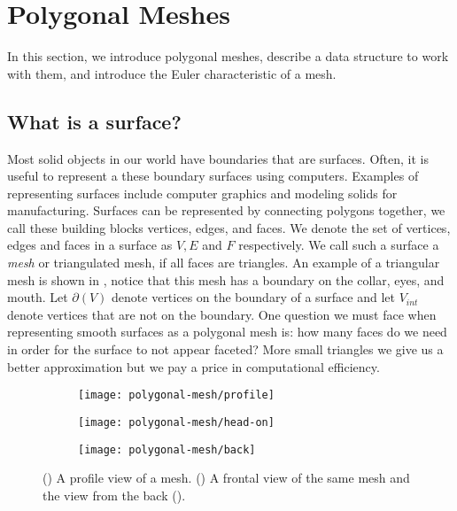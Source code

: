\section{Polygonal Meshes}
\label{sec:polygonal}

In this section, we introduce polygonal meshes, describe a data structure to 
work with them, and introduce the Euler characteristic of a mesh.

\subsection{What is a surface?}

Most solid objects in our world have boundaries that are surfaces.
Often, it is useful to represent a these boundary surfaces using computers.
Examples of representing surfaces include computer graphics and modeling solids for manufacturing.
Surfaces can be represented by connecting polygons together, we call these building blocks
vertices, edges, and faces. We denote the set of vertices, edges and faces in a surface as 
$V, E$ and $F$ respectively. We call such a surface a \emph{mesh}
or triangulated mesh, if all faces are triangles.
An example of a triangular mesh is shown in ,
notice that this mesh has a boundary on the collar, eyes, and mouth.
Let $\partial(V)$ denote vertices on the boundary of a surface and let $V_{int}$ 
denote vertices that are not on the boundary.
One question we must face when representing smooth surfaces as a polygonal mesh is:
how many faces do we need in order for the surface to not appear faceted?
More small triangles we give us a better approximation but we pay a price in computational
efficiency. 



 \begin{figure}[htb]
         \centering
        \begin{subfigure}[b]{0.3\textwidth}
         \texttt{[image: polygonal-mesh/profile]}
         \caption{}
 	 \label{fig:profile}
       \end{subfigure}
         \hspace{.6cm}
         \begin{subfigure}[b]{0.19\textwidth}
         \texttt{[image: polygonal-mesh/head-on]}
         \caption{}
          \label{fig:head-on}
         \end{subfigure}
             \hspace{.6cm}
         \begin{subfigure}[b]{0.24\textwidth}
         \texttt{[image: polygonal-mesh/back]}
         \caption{}
          \label{fig:back}
         \end{subfigure}
		\caption{() A profile view of a mesh.
 		()  A frontal view of the same mesh and the view from the back ().
 		\label{fig:cat}}
 \end{figure}

